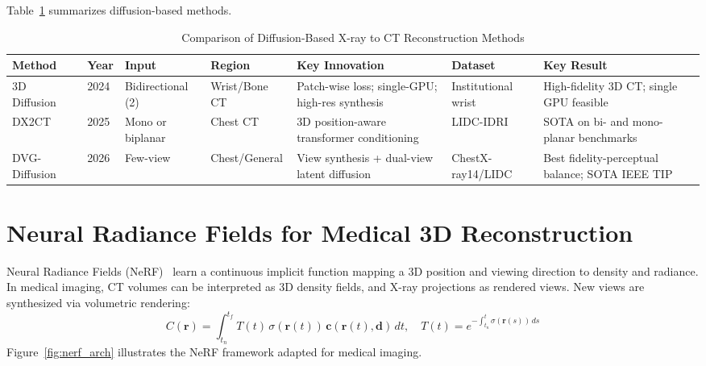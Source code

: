 \documentclass[10pt,twocolumn,a4paper]{article}
\begin{document}
Table~\ref{tab:diffusion_comparison} summarizes diffusion-based methods.

\begin{table}[t]
\caption{Comparison of Diffusion-Based X-ray to CT Reconstruction Methods}
\label{tab:diffusion_comparison}
\centering\small
\setlength{\tabcolsep}{4pt}
\begin{tabular}{@{}llllp{2.8cm}p{2.0cm}p{3.0cm}@{}}
\toprule
\textbf{Method} & \textbf{Year} & \textbf{Input} & \textbf{Region} &
\textbf{Key Innovation} & \textbf{Dataset} & \textbf{Key Result}\\
\midrule
3D Diffusion~\cite{yoon2024} & 2024 & Bidirectional (2) & Wrist/Bone CT &
  Patch-wise loss; single-GPU; high-res synthesis & Institutional wrist &
  High-fidelity 3D CT; single GPU feasible\\
DX2CT~\cite{dx2ct} & 2025 & Mono or biplanar & Chest CT &
  3D position-aware transformer conditioning & LIDC-IDRI &
  SOTA on bi- and mono-planar benchmarks\\
DVG-Diffusion~\cite{dvgdiffusion} & 2026 & Few-view & Chest/General &
  View synthesis + dual-view latent diffusion & ChestX-ray14/LIDC &
  Best fidelity-perceptual balance; SOTA IEEE TIP\\
\bottomrule
\end{tabular}
\end{table}

\section{Neural Radiance Fields for Medical 3D Reconstruction}
\label{sec:nerf}

Neural Radiance Fields (NeRF)~\cite{nerf2020} learn a continuous implicit
function mapping a 3D position and viewing direction to density and radiance.
In medical imaging, CT volumes can be interpreted as 3D density fields, and
X-ray projections as rendered views. New views are synthesized via volumetric
rendering:
\begin{equation}
C(\mathbf{r}) = \int_{t_n}^{t_f} T(t)\,\sigma(\mathbf{r}(t))\,
\mathbf{c}(\mathbf{r}(t),\mathbf{d})\,dt, \quad
T(t) = e^{-\int_{t_n}^{t}\sigma(\mathbf{r}(s))\,ds}
\label{eq:nerf}
\end{equation}
Figure~\ref{fig:nerf_arch} illustrates the NeRF framework adapted for medical
imaging.
\end{document}
